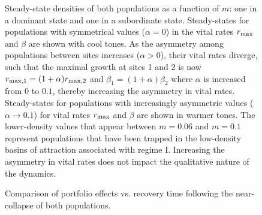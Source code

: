 \documentclass{revtex4}
\begin{document}
\begin{figure}
  \captionsetup{justification=raggedright,
singlelinecheck=false
}
\centering
\caption{
Steady-state densities of both populations as a function of $m$: one in a dominant state and one in a subordinate state.
Steady-states for populations with symmetrical values ($\alpha=0$) in the vital rates $r_{\rm max}$ and $\beta$ are shown with cool tones.
As the asymmetry among populations between sites increases ($\alpha>0$), their vital rates diverge, such that the maximal growth at sites 1 and 2 is now $r_{\rm max,1}=(1 + \alpha)r_{\rm max,2}$ and $\beta_1=(1+\alpha)\beta_2$ where $\alpha$ is increased from $0$ to $0.1$, thereby increasing the asymmetry in vital rates.
Steady-states for populations with increasingly asymmetric values ($\alpha\rightarrow 0.1$) for vital rates $r_{\rm max}$ and $\beta$ are shown in warmer tones.
The lower-density values that appear between $m=0.06$ and $m=0.1$ represent populations that have been trapped in the low-density basins of attraction associated with regime I.
Increasing the asymmetry in vital rates does not impact the qualitative nature of the dynamics.
} \label{fig:symmetry}
\end{figure}




\begin{figure}
  \captionsetup{justification=raggedright,
singlelinecheck=false
}
\centering
\caption{
Comparison of portfolio effects vs. recovery time following the near-collapse of both populations.
} \label{fig:pevsrt}
\end{figure}
\end{document}
